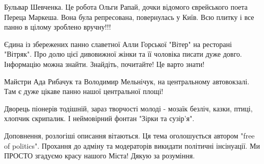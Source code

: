 Бульвар Шевченка. Це робота Ольги Рапай, дочки відомого єврейського поета
Переца Маркеша. Вона була репресована, повернулась у Київ. Всю плитку і все
панно в цілому зроблено вручну!!!

Єдина із збережених панно славетної Алли Горської "Вітер" на ресторані
"Вітряк". Про долю цієї дивовижної жінки та її чоловіка писати дуже довго.
Інформацію можна знайти. Знайдіть, почитайте! Це варто знати!

Майстри Ада Рибачук та Володимир Мельнічук, на центральному автовокзалі. Там є
дуже цікаве панно нашої центральної площі!

Дворець піонерів тодішній, зараз творчості молоді - мозаїк безліч, казки,
птиці, хлопчик скрипалик. І неймовірний фонтан "Зірки та сузір'я".

Доповнення, розлогіші описання вітаються. Ця тема оголошується автором "free of
politics". Прохання до адміну та модераторів викидати політичні інсінуації. Ми
ПРОСТО згадуємо красу нашого Міста! Дякую за розуміння.
